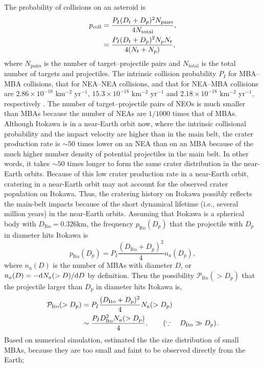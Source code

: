 \documentclass[3p,authoryear]{elsarticle}
\begin{document}
The probability of collisions on an asteroid is
\begin{align}
	p_\text{coll}&=\frac{P_I(D_t+D_p)^2N_\text{pairs}}{4 N_\text{total}}, \notag\\
	&=\frac{P_I(D_t+D_p)^2N_pN_t}{4(N_t+N_p)},
\end{align}
where $N_\text{pairs}$ is the number of target--projectile pairs and $N_\text{total}$ is the total number of targets and projectiles.
The intrinsic collision probability $P_I$ for MBA--MBA collisions, that for NEA--NEA collisions, and that for NEA--MBA collisions are $2.86\times 10^{-18}$ km$^{-2}$ yr$^{-1}$, $15.3\times 10^{-18}$ km$^{-2}$ yr$^{-1}$ and $2.18\times 10^{-18}$ km$^{-2}$ yr$^{-1}$, respectively \citep{bottke1994}.
The number of target--projectile pairs of NEOs is much smaller than MBAs because the number of NEAs are $1/1000$ times that of MBAs.
Although Itokawa is in a near-Earth orbit now, where the intrinsic collisional probability and the impact velocity are higher than in the main belt,
the crater production rate is $\sim 50$ times lower on an NEA than on an MBA because of the much higher number density of potential projectiles in the main belt.
In other words, it takes $\sim 50$ times longer to form the same crater distribution in the near-Earth orbits.
Because of this low crater production rate in a near-Earth orbit, cratering in a near-Earth orbit may not account for the observed crater population on Itokawa.
Thus, the cratering history on Itokawa possibly reflects the main-belt impacts because of the short dynamical lifetime (i.e., several million years) in the near-Earth orbits.
Assuming that Itokawa is a spherical body with $D_\text{Ito}=0.326$km, the frequency $p_\text{Ito}(D_p)$ that the projectile with $D_p$ in diameter hits Itokawa is
\begin{equation}
	p_\text{Ito}(D_p) = P_I\frac{(D_\text{Ito}+D_p)^2}{4}n_a(D_p),
\end{equation}
where $n_a(D)$ is the number of MBAs with diameter $D$, or $n_a(D)=-{\rm d} N_a(>D)/{\rm d} D$ by definition.
Then the possibility $\mathcal{P}_\text{Ito}(>D_p)$ that the projectile larger than $D_p$ in diameter hits Itokawa is,
\begin{align}
	\mathcal{P}_\text{Ito}(>D_p) &= P_I\frac{(D_\text{Ito}+D_p)^2}{4}N_a(>D_p) \notag\\
	&\sim \frac{P_I D_\text{Ito}^2N_a(>D_p)}{4},\qquad (\because\quad D_\text{Ito} \gg D_p).
\end{align}
Based on numerical simulation, \citet{obrien2005} estimated the the size distribution of small MBAs, because they are too small and faint to be observed directly from the Earth;
\end{document}
